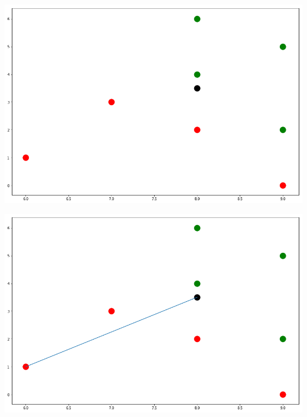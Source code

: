 \documentclass[fontsize=11pt]{scrartcl}
\newenvironment{Figure}
  {\par\medskip\noindent\minipage{\linewidth}}
  {\endminipage\par\medskip}
\begin{document}
                \begin{Figure}
                    \begin{minipage}[b]{.4\linewidth}
                        \includegraphics[scale=0.2]{nn1.png}
                    \end{minipage}
                    \hspace{.1\linewidth}
                    \begin{minipage}[b]{.4\linewidth}
                        \includegraphics[scale=0.2]{nn2.png}
                    \end{minipage}
                \end{Figure}
\end{document}
